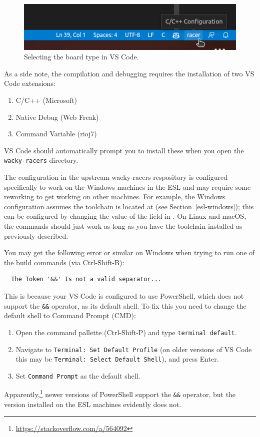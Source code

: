 \begin{figure}
\centering
\includegraphics{figs/vscode-config.png}
\caption{Selecting the board type in VS Code.}
\label{fig:vscode-config}
\end{figure}

As a side note, the compilation and debugging requires the
installation of two VS Code extensions:
%
\begin{enumerate}
\item C/C++ (Microsoft)
\item Native Debug (Web Freak)
\item Command Variable (rioj7)
\end{enumerate}
%
VS Code should automatically prompt you to install these when you open
the \verb|wacky-racers| directory.

The  configuration in the upstream wacky-racers
respository is configured specifically to work on the Windows machines
in the ESL and may require some reworking to get working on other
machines. For example, the Windows configuration assumes the toolchain
is located at  (see
Section~\ref{esl-windows}); this can be configured by changing the
value of the  field in
. On Linux and macOS, the commands should
just work as long as you have the toolchain installed as previously
described.

You may get the following error or similar on Windows when trying to
run one of the build commands (via Ctrl-Shift-B):
\begin{verbatim}
  The Token '&&' Is not a valid separator...
\end{verbatim}
This is because your VS Code is configured to use PowerShell, which
does not support the \verb|&&| operator, as its default shell. To fix
this you need to change the default shell to Command Prompt (CMD):
\begin{enumerate}
  \item Open the command pallette (Ctrl-Shift-P) and type
  \verb|terminal default|.
  \item Navigate to \verb|Terminal: Set Default Profile| (on older
  versions of VS Code this may be \verb|Terminal: Select Default Shell|),
  and press Enter.
  \item Set \verb|Command Prompt| as the default shell.
\end{enumerate}
Apparently,\footnote{\url{https://stackoverflow.com/a/564092}} newer
versions of PowerShell support the \verb|&&| operator, but the version
installed on the ESL machines evidently does not.

